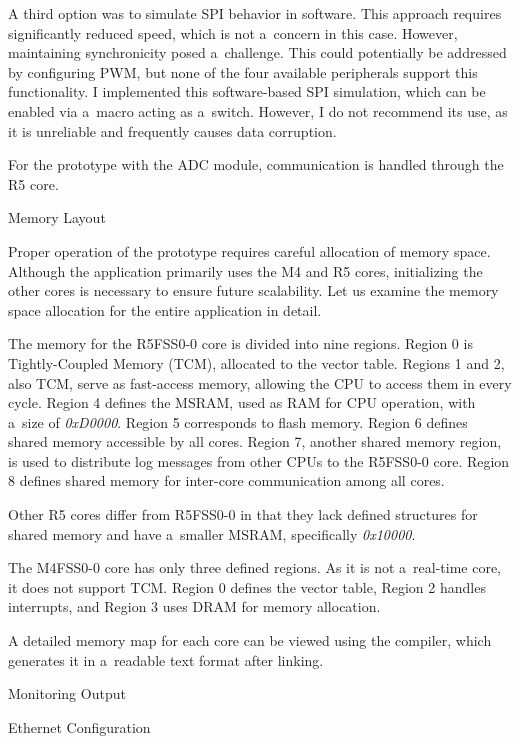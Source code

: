 A third option was to simulate SPI behavior in software. This approach requires significantly reduced speed, which is not a~concern in this case. However, maintaining synchronicity posed a~challenge. This could potentially be addressed by configuring PWM, but none of the four available peripherals support this functionality. I implemented this software-based SPI simulation, which can be enabled via a~macro acting as a~switch. However, I do not recommend its use, as it is unreliable and frequently causes data corruption.

For the prototype with the ADC module, communication is handled through the R5 core.

\sec Memory Layout

Proper operation of the prototype requires careful allocation of memory space. Although the application primarily uses the M4 and R5 cores, initializing the other cores is necessary to ensure future scalability. Let us examine the memory space allocation for the entire application in detail.

The memory for the R5FSS0-0 core is divided into nine regions. Region 0 is Tightly-Coupled Memory (TCM), allocated to the vector table. Regions 1 and 2, also TCM, serve as fast-access memory, allowing the CPU to access them in every cycle. Region 4 defines the MSRAM, used as RAM for CPU operation, with a~size of {\it 0xD0000}. Region 5 corresponds to flash memory. Region 6 defines shared memory accessible by all cores. Region 7, another shared memory region, is used to distribute log messages from other CPUs to the R5FSS0-0 core. Region 8 defines shared memory for inter-core communication among all cores.

Other R5 cores differ from R5FSS0-0 in that they lack defined structures for shared memory and have a~smaller MSRAM, specifically {\it 0x10000}.

The M4FSS0-0 core has only three defined regions. As it is not a~real-time core, it does not support TCM. Region 0 defines the vector table, Region 2 handles interrupts, and Region 3 uses DRAM for memory allocation.

A detailed memory map for each core can be viewed using the compiler, which generates it in a~readable text format after linking.

\sec Monitoring Output

\secc Ethernet Configuration

